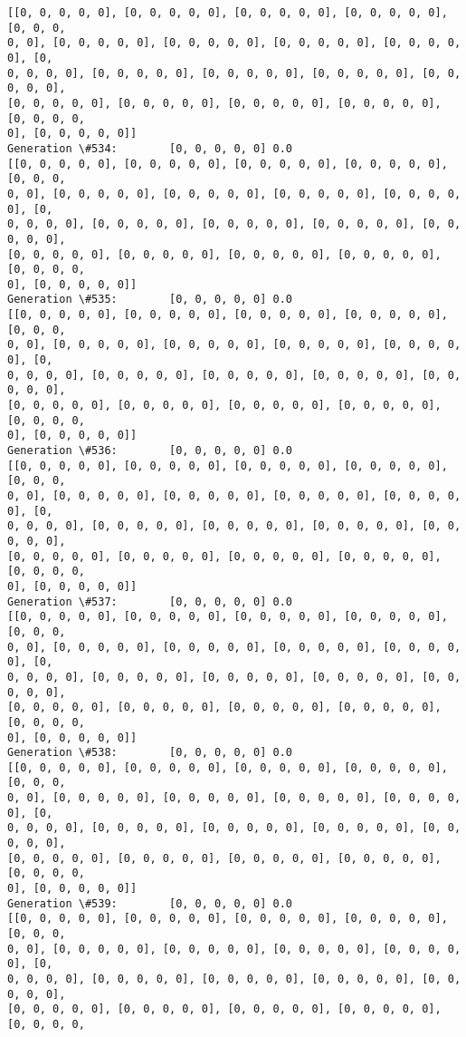 \documentclass[11pt]{article}
\begin{document}
\begin{Verbatim}[commandchars=\\\{\}]
[[0, 0, 0, 0, 0], [0, 0, 0, 0, 0], [0, 0, 0, 0, 0], [0, 0, 0, 0, 0], [0, 0, 0,
0, 0], [0, 0, 0, 0, 0], [0, 0, 0, 0, 0], [0, 0, 0, 0, 0], [0, 0, 0, 0, 0], [0,
0, 0, 0, 0], [0, 0, 0, 0, 0], [0, 0, 0, 0, 0], [0, 0, 0, 0, 0], [0, 0, 0, 0, 0],
[0, 0, 0, 0, 0], [0, 0, 0, 0, 0], [0, 0, 0, 0, 0], [0, 0, 0, 0, 0], [0, 0, 0, 0,
0], [0, 0, 0, 0, 0]]
Generation \#534:        [0, 0, 0, 0, 0] 0.0
[[0, 0, 0, 0, 0], [0, 0, 0, 0, 0], [0, 0, 0, 0, 0], [0, 0, 0, 0, 0], [0, 0, 0,
0, 0], [0, 0, 0, 0, 0], [0, 0, 0, 0, 0], [0, 0, 0, 0, 0], [0, 0, 0, 0, 0], [0,
0, 0, 0, 0], [0, 0, 0, 0, 0], [0, 0, 0, 0, 0], [0, 0, 0, 0, 0], [0, 0, 0, 0, 0],
[0, 0, 0, 0, 0], [0, 0, 0, 0, 0], [0, 0, 0, 0, 0], [0, 0, 0, 0, 0], [0, 0, 0, 0,
0], [0, 0, 0, 0, 0]]
Generation \#535:        [0, 0, 0, 0, 0] 0.0
[[0, 0, 0, 0, 0], [0, 0, 0, 0, 0], [0, 0, 0, 0, 0], [0, 0, 0, 0, 0], [0, 0, 0,
0, 0], [0, 0, 0, 0, 0], [0, 0, 0, 0, 0], [0, 0, 0, 0, 0], [0, 0, 0, 0, 0], [0,
0, 0, 0, 0], [0, 0, 0, 0, 0], [0, 0, 0, 0, 0], [0, 0, 0, 0, 0], [0, 0, 0, 0, 0],
[0, 0, 0, 0, 0], [0, 0, 0, 0, 0], [0, 0, 0, 0, 0], [0, 0, 0, 0, 0], [0, 0, 0, 0,
0], [0, 0, 0, 0, 0]]
Generation \#536:        [0, 0, 0, 0, 0] 0.0
[[0, 0, 0, 0, 0], [0, 0, 0, 0, 0], [0, 0, 0, 0, 0], [0, 0, 0, 0, 0], [0, 0, 0,
0, 0], [0, 0, 0, 0, 0], [0, 0, 0, 0, 0], [0, 0, 0, 0, 0], [0, 0, 0, 0, 0], [0,
0, 0, 0, 0], [0, 0, 0, 0, 0], [0, 0, 0, 0, 0], [0, 0, 0, 0, 0], [0, 0, 0, 0, 0],
[0, 0, 0, 0, 0], [0, 0, 0, 0, 0], [0, 0, 0, 0, 0], [0, 0, 0, 0, 0], [0, 0, 0, 0,
0], [0, 0, 0, 0, 0]]
Generation \#537:        [0, 0, 0, 0, 0] 0.0
[[0, 0, 0, 0, 0], [0, 0, 0, 0, 0], [0, 0, 0, 0, 0], [0, 0, 0, 0, 0], [0, 0, 0,
0, 0], [0, 0, 0, 0, 0], [0, 0, 0, 0, 0], [0, 0, 0, 0, 0], [0, 0, 0, 0, 0], [0,
0, 0, 0, 0], [0, 0, 0, 0, 0], [0, 0, 0, 0, 0], [0, 0, 0, 0, 0], [0, 0, 0, 0, 0],
[0, 0, 0, 0, 0], [0, 0, 0, 0, 0], [0, 0, 0, 0, 0], [0, 0, 0, 0, 0], [0, 0, 0, 0,
0], [0, 0, 0, 0, 0]]
Generation \#538:        [0, 0, 0, 0, 0] 0.0
[[0, 0, 0, 0, 0], [0, 0, 0, 0, 0], [0, 0, 0, 0, 0], [0, 0, 0, 0, 0], [0, 0, 0,
0, 0], [0, 0, 0, 0, 0], [0, 0, 0, 0, 0], [0, 0, 0, 0, 0], [0, 0, 0, 0, 0], [0,
0, 0, 0, 0], [0, 0, 0, 0, 0], [0, 0, 0, 0, 0], [0, 0, 0, 0, 0], [0, 0, 0, 0, 0],
[0, 0, 0, 0, 0], [0, 0, 0, 0, 0], [0, 0, 0, 0, 0], [0, 0, 0, 0, 0], [0, 0, 0, 0,
0], [0, 0, 0, 0, 0]]
Generation \#539:        [0, 0, 0, 0, 0] 0.0
[[0, 0, 0, 0, 0], [0, 0, 0, 0, 0], [0, 0, 0, 0, 0], [0, 0, 0, 0, 0], [0, 0, 0,
0, 0], [0, 0, 0, 0, 0], [0, 0, 0, 0, 0], [0, 0, 0, 0, 0], [0, 0, 0, 0, 0], [0,
0, 0, 0, 0], [0, 0, 0, 0, 0], [0, 0, 0, 0, 0], [0, 0, 0, 0, 0], [0, 0, 0, 0, 0],
[0, 0, 0, 0, 0], [0, 0, 0, 0, 0], [0, 0, 0, 0, 0], [0, 0, 0, 0, 0], [0, 0, 0, 0,

\end{Verbatim}
\end{document}
